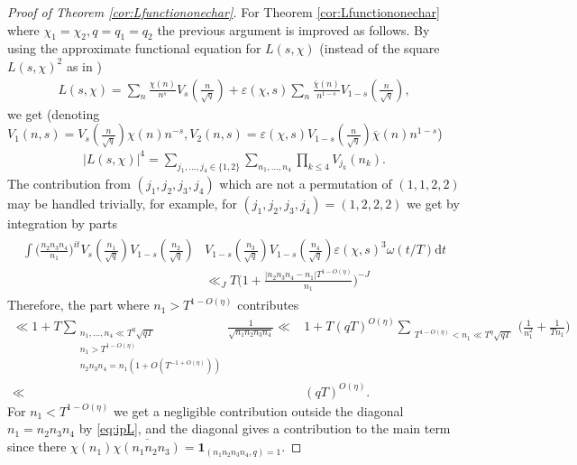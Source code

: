 \documentclass[12pt]{amsart}
\theoremstyle{definition}
\theoremstyle{remark}
\numberwithin{equation}{section}
\newcommand{\1}{{\mathbf 1}}
\newcommand{\eps}{\varepsilon}
\renewcommand{\d}{\mathrm d}
\begin{document}
\begin{proof}[Proof of Theorem \ref{cor:Lfunctiononechar}]
For Theorem \ref{cor:Lfunctiononechar} where $\chi_1 = \chi_2, q=q_1=q_2$ the previous argument is improved as follows. By using the approximate functional equation for $L(s,\chi)$ \cite[Theorem 5.3]{IKbook}  (instead of the square $L(s,\chi)^2$ as in \cite{berke})
\begin{align*}
    L(s,\chi) = \sum_{n} \frac{\chi(n)}{n^s} V_s(\frac{n}{\sqrt{q}}) + \eps(\chi,s) \sum_{n} \frac{\overline{\chi}(n)}{n^{1-s}} V_{1-s}(\frac{n}{\sqrt{q}}),
\end{align*}
we get (denoting $V_1(n,s) = V_s(\frac{n}{\sqrt{q}}) \chi(n) n^{-s},V_2(n,s) = \eps(\chi,s)V_{1-s}(\frac{n}{\sqrt{q}})  \overline{\chi}(n)n^{1-s}$)
\begin{align*}
    |L(s,\chi)|^4 = \sum_{j_1,\dots,j_4 \in \{1,2\} } \sum_{n_1,\dots,n_4}  \prod_{k \leq 4}V_{j_k}(n_k).
\end{align*}
The contribution from $(j_1,j_2,j_3,j_4) $ which are not a permutation of $(1,1,2,2)$ may be handled trivially, for example, for $(j_1,j_2,j_3,j_4)=(1,2,2,2)$ we get  by  integration by parts
\begin{align} \label{eq:ipL}
\begin{split}
        \int \bigg(\frac{n_2n_3n_4}{n_1}\bigg)^{it} V_s(\frac{n_1}{\sqrt{q}}) V_{1-s}(\frac{n_2}{\sqrt{q}})  &V_{1-s}(\frac{n_3}{\sqrt{q}})  V_{1-s}(\frac{n_4}{\sqrt{q}}) \eps(\chi,s)^3 \omega(t/T) \d t  \\
    &\ll_J T \bigg(1+ \frac{|n_2n_3 n_4-n_1|  T^{1-O(\eta)}}{n_1}\bigg)^{-J}
\end{split}
\end{align}
Therefore, the part where $n_1 > T^{1-O(\eta)}$ contributes 
\begin{align*}
 \ll 1+  T \sum_{\substack{n_1,\dots,n_4 \ll T^\eta \sqrt{q T} \\ n_1 > T^{1-O(\eta)}  \\ n_2n_3 n_4 = n_1 (1+ O(T^{-1 + O(\eta)})) } } \frac{1}{\sqrt{n_1 n_2 n_3 n_4}} \ll& 1+  T (qT)^{O(\eta)} \sum_{\substack{T^{1-O(\eta)}< n_1 \ll T^\eta \sqrt{q T}  } } \bigg(\frac{1 }{n_1^2}  + \frac{1 }{T n_1}\bigg) \\
 \ll &(qT)^{O(\eta)}.
\end{align*}
For $n_1 < T^{1-O(\eta)}$ we get a negligible contribution outside the diagonal $n_1=n_2n_3n_4$ by \eqref{eq:ipL}, and the diagonal gives a contribution to the main term since there $\chi(n_1) \overline{\chi (n_1n_2n_3)} = \mathbf{1}_{(n_1n_2n_3n_4,q) = 1}$.


\end{proof}
\end{document}
